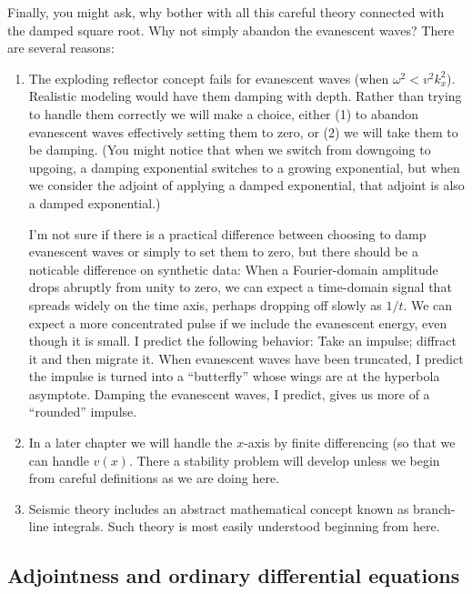 \par
Finally, you might ask, why bother with all this careful theory
connected with the damped square root.
Why not simply abandon the evanescent waves?
There are several reasons:
\begin{enumerate}
\item
The exploding reflector concept fails for evanescent waves
(when $\omega^2 < v^2k_x^2$).
Realistic modeling would have them damping with depth.
Rather than trying to handle them correctly we will make a choice,
either (1) to abandon evanescent waves effectively setting them to zero,
or (2) we will take them to be damping.
(You might notice that when we switch from downgoing to upgoing,
a damping exponential switches to a growing exponential,
but when we consider the adjoint of applying a damped exponential,
that adjoint is also a damped exponential.)
\par
I'm not sure if there is a practical difference between
choosing to damp evanescent waves or simply to set them to zero,
but there should be a noticable difference on synthetic data:
When a Fourier-domain amplitude drops abruptly
from unity to zero, we can expect a time-domain signal
that spreads widely on the time axis,
perhaps dropping off slowly as $1/t$.
We can expect a more concentrated pulse
if we include the evanescent energy, even though it is small.
I predict the following behavior:
Take an impulse; diffract it and then migrate it.
When evanescent waves have been truncated, I predict
the impulse is turned into a ``butterfly'' whose wings
are at the hyperbola asymptote.
Damping the evanescent waves, I predict,
gives us more of a ``rounded'' impulse.
\item
In a later chapter we will handle the $x$-axis by finite differencing
(so that we can handle $v(x)$.
There a stability problem will develop unless we begin
from careful definitions as we are doing here.
\item
Seismic theory includes an abstract mathematical concept
known as branch-line integrals.
Such theory is most easily understood beginning from here.
\end{enumerate}




\subsection{Adjointness and ordinary differential equations}

